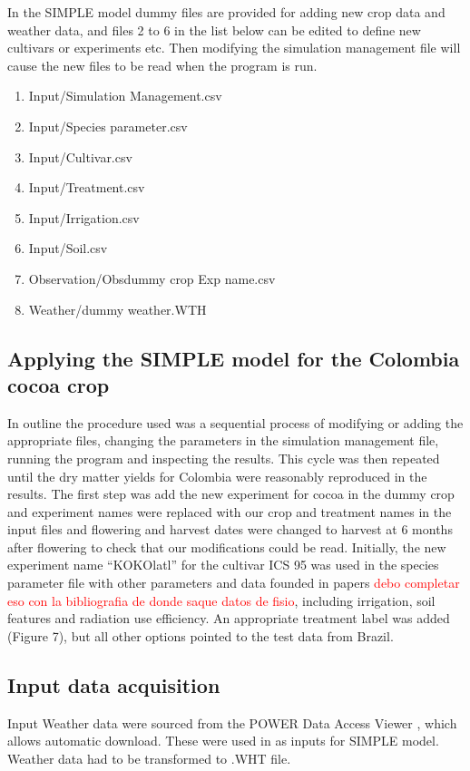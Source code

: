 \documentclass[gene,journal,article,submit,moreauthors,pdftex]{Definitions/mdpi}
\begin{document}
In the SIMPLE model dummy files are provided for adding new crop data and weather data, and files 2 to 6 in the list below can be edited to define new cultivars or experiments etc. Then modifying the simulation management file will cause the new files to be read when the program is run.
\begin{enumerate}
	\item Input/Simulation Management.csv
	\item Input/Species parameter.csv
	\item Input/Cultivar.csv
    \item Input/Treatment.csv	
    \item Input/Irrigation.csv
    \item Input/Soil.csv
    \item Observation/Obsdummy crop Exp name.csv	
    \item Weather/dummy weather.WTH
\end{enumerate}

\subsection{Applying the SIMPLE model for the Colombia cocoa crop }

In outline the procedure used was a sequential process of modifying or adding the appropriate files, changing the parameters in the simulation management file, running the program and inspecting the results. This cycle was then repeated until the dry matter yields for Colombia were reasonably reproduced in the results. 
The first step was add the new experiment for cocoa in the dummy crop and experiment names were replaced with our crop and treatment names in the input files and flowering and harvest dates were changed to harvest at 6 months after flowering to check that our modifications could be read. Initially, the new experiment name “KOKOlatl” for the cultivar ICS 95 was used in the species parameter file with other parameters and data founded in papers \textcolor{red}{debo completar eso con la bibliografia de donde saque datos de fisio}, including irrigation, soil features and radiation use efficiency. An appropriate treatment label was added (Figure 7), but all other options pointed to the test data from Brazil.  

\subsection{Input data acquisition } 
Input Weather data were sourced from the POWER Data Access Viewer \citep{nasapower}, which allows automatic download. These were used in as inputs for SIMPLE model. Weather data had to be transformed to .WHT file.
\end{document}
